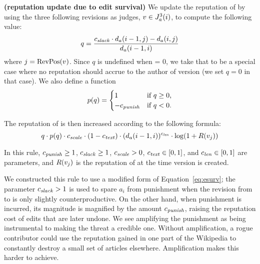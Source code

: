 \begin{regola}
\textbf{(reputation update due to edit survival)}
\label{rule-edit}
  We update the reputation of  by
  using the three following revisions as judges,
  $v \in J_{a}^{3}(i)$, to compute the following value:
\begin{equation*}
q = \frac{\slack \cdot \dist{a}{i-1,j} - \dist{a}{i,j}}
                        {\dist{a}{i-1,i}}
\label{eq-edit-long}
\end{equation*}
where $j = \mathrm{RevPos}(v_{})$.
Since $q$ is undefined when  = 0,
we take that to be a special case where no reputation
should accrue to the author of version 
(\ie we set $q = 0$ in that case).
We also define a  function
\begin{equation*}
    p(q) =
        \begin{cases}
            1 & \text{if $q \ge 0$,} \\
            -{c_{{\text{\textit{punish}}}}} & \text{if $q < 0$.} \\
        \end{cases}
\end{equation*}

The reputation of  is then increased
according to the following formula:
\begin{equation*}
q \cdot p(q) 
  \cdot {c_{{\text{\textit{scale}}}}} \cdot (1 - {c_{{\text{\textit{text}}}}}) \cdot 
        (d_{a}(i-1,i))^{c_{{\text{\textit{len}}}}} \cdot \log(1 + R(v_{j}))
\end{equation*}

  In this rule, ${c_{{\text{\textit{punish}}}}} \geq 1$, ${c_{{\text{\textit{slack}}}}} \geq 1$, ${c_{{\text{\textit{scale}}}}} > 0$, 
  ${c_{{\text{\textit{text}}}}} \in [0,1]$, and ${c_{{\text{\textit{len}}}}} \in [0,1]$ are parameters,
  and $R(v_{j})$ is the reputation of 
  at the time version  is created.
\end{regola}

We constructed this rule to use a modified form of
Equation~\ref{eq:esurv};
the parameter ${c_{{\text{\textit{slack}}}}} > 1$ is used to spare $a_i$ from punishment when
the revision from  to  is only slightly
counterproductive.
On the other hand, when punishment is incurred, its magnitude is
magnified by the amount ${c_{{\text{\textit{punish}}}}}$, raising the reputation cost of
edits that are later undone. 
We see amplifying the punishment as being instrumental
to making the threat a credible one. 
Without amplification, a rogue contributor could use the reputation
gained in one part of the Wikipedia to constantly destroy a small set
of articles elsewhere.
Amplification makes this harder to achieve. 

